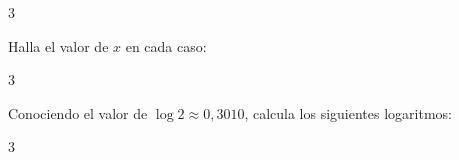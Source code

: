 \begin{questions}
\begin{multicols}{3}
    \end{multicols}

    \question
    Halla el valor de $x$ en cada caso:
    \begin{multicols}{3}
    \end{multicols}

    \question
    Conociendo el valor de $\log 2 \approx 0,3010$, calcula los siguientes logaritmos:
    \begin{multicols}{3}
\end{multicols}
\end{questions}
